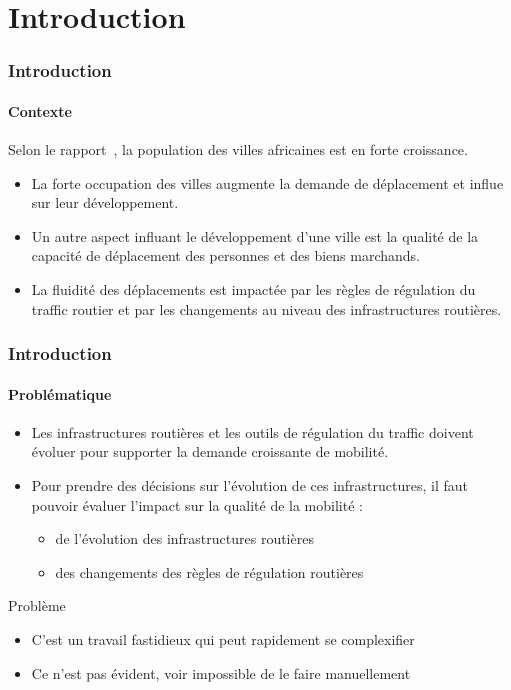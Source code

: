 %
%
%


\section{Introduction}\label{sec:section-1}
\begin{frame}
    \frametitle{Introduction}
    \framesubtitle{Contexte}
    Selon le rapport~\autocite{somik2017opening}, la population des villes africaines est en forte croissance.

    \begin{itemize}
        \item La forte occupation des villes augmente la demande de déplacement et influe sur leur développement.
        \item Un autre aspect influant le développement d'une ville est la qualité de la capacité de déplacement des personnes et des biens marchands.
        \item La fluidité des déplacements est impactée par les règles de régulation du traffic routier et par les changements au niveau des infrastructures routières.
    \end{itemize}

\end{frame}

\begin{frame}
    \frametitle{Introduction}
    \framesubtitle{Problématique}

    \begin{itemize}
        \item Les infrastructures routières et les outils de régulation du traffic doivent évoluer pour supporter la demande croissante de mobilité.
        \item Pour prendre des décisions sur l'évolution de ces infrastructures, il faut pouvoir évaluer l'impact sur la qualité de la mobilité :
        \begin{itemize}
            \item de l'évolution des infrastructures routières
            \item des changements des règles de régulation routières
        \end{itemize}
    \end{itemize}

    \begin{alertblock}{Problème}

        \begin{itemize}
            \item C'est un travail fastidieux qui peut rapidement se complexifier
            \item Ce n'est pas évident, voir impossible de le faire manuellement
        \end{itemize}
    \end{alertblock}
\end{frame}

